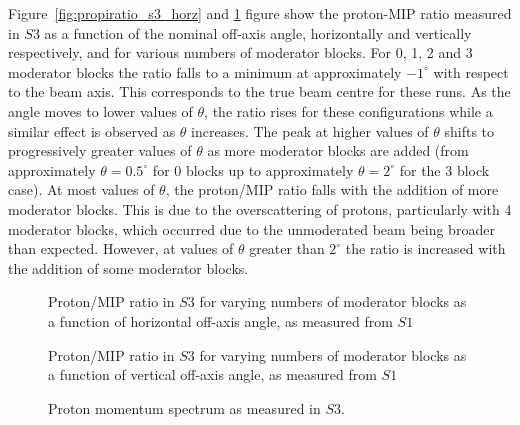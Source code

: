 Figure~\ref{fig:propiratio_s3_horz} and \ref{fig:propiratio_s3_vert} figure show the proton-MIP ratio measured in $\mathit{S3}$ as a function of the nominal off-axis angle, horizontally and vertically respectively, and for various numbers of moderator blocks.
For 0, 1, 2 and 3 moderator blocks the ratio falls to a minimum at approximately $-1^{\circ}$ with respect to the beam axis. This corresponds to the true beam centre for these runs.
As the angle moves to lower values of $\theta$, the ratio rises for these configurations while a similar effect is observed as $\theta$ increases.
The peak at higher values of $\theta$ shifts to progressively greater values of $\theta$ as more moderator blocks are added (from approximately $\theta = 0.5^{\circ}$ for 0 blocks up to approximately $\theta = 2^{\circ}$ for the 3 block case).
At most values of $\theta$, the proton/MIP ratio falls with the addition of more moderator blocks. 
This is due to the overscattering of protons, particularly with 4 moderator blocks, which occurred due to the unmoderated beam being broader than expected.
However, at values of $\theta$ greater than $2^{\circ}$ the ratio is increased with the addition of some moderator blocks.

\begin{figure}[!ht]
  \begin{minipage}[t]{0.48\textwidth}
    \begin{adjustbox}{max totalsize={\textwidth}{.35\textheight}, center}
      
    \end{adjustbox}
    \caption{Proton/MIP ratio in $\mathit{S3}$ for varying numbers of moderator blocks as a function of horizontal off-axis angle, as measured from $\mathit{S1}$}
    \label{fig:propiratio_s3_horz}
  \end{minipage}
  \hspace{0.3cm}
  \begin{minipage}[t]{0.48\textwidth}
    \begin{adjustbox}{max totalsize={\textwidth}{.35\textheight}, center}
      
    \end{adjustbox}
    \caption{Proton/MIP ratio in $\mathit{S3}$ for varying numbers of moderator blocks as a function of vertical off-axis angle, as measured from $\mathit{S1}$}
    \label{fig:propiratio_s3_vert}
  \end{minipage}	
\end{figure}

\begin{figure}[ht]
  \centering
  \begin{adjustbox}{max totalsize={0.8\textwidth}, center}
    
  \end{adjustbox}
  \caption{Proton momentum spectrum as measured in $\mathit{S3}$.}
  \label{fig:s3promom}
\end{figure}

